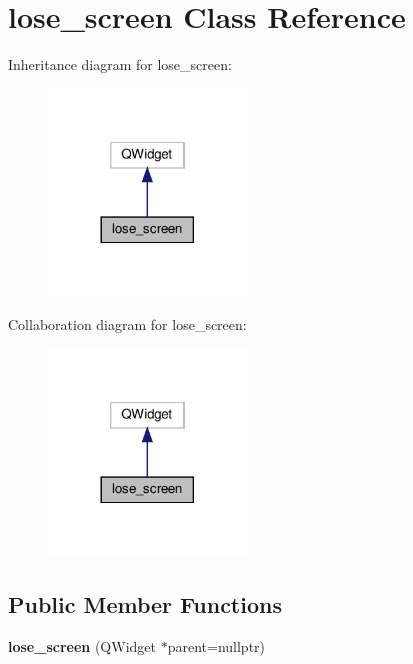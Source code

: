 \hypertarget{classlose__screen}{}\section{lose\+\_\+screen Class Reference}
\label{classlose__screen}


Inheritance diagram for lose\+\_\+screen\+:\nopagebreak
\begin{figure}[H]
\begin{center}
\leavevmode
\includegraphics[width=149pt]{classlose__screen__inherit__graph}
\end{center}
\end{figure}


Collaboration diagram for lose\+\_\+screen\+:\nopagebreak
\begin{figure}[H]
\begin{center}
\leavevmode
\includegraphics[width=149pt]{classlose__screen__coll__graph}
\end{center}
\end{figure}
\subsection*{Public Member Functions}
\begin{DoxyCompactItemize}
\item 
\mbox{\label{classlose__screen_a4f8848074280e3ea90ab9f6c6c66852a}} 
{\bfseries lose\+\_\+screen} (Q\+Widget $\ast$parent=nullptr)
\end{DoxyCompactItemize}
